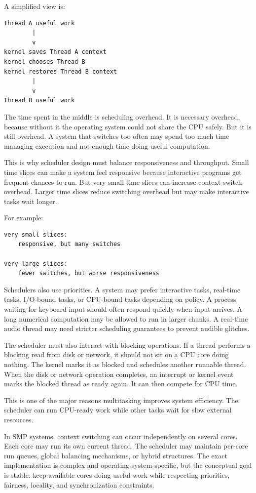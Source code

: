 A simplified view is:

\begin{verbatim}
Thread A useful work
        |
        v
kernel saves Thread A context
kernel chooses Thread B
kernel restores Thread B context
        |
        v
Thread B useful work
\end{verbatim}

The time spent in the middle is scheduling overhead. It is necessary overhead, because without it the operating system could not share the CPU safely. But it is still overhead. A system that switches too often may spend too much time managing execution and not enough time doing useful computation.

This is why scheduler design must balance responsiveness and throughput. Small time slices can make a system feel responsive because interactive programs get frequent chances to run. But very small time slices can increase context-switch overhead. Larger time slices reduce switching overhead but may make interactive tasks wait longer.

For example:

\begin{verbatim}
very small slices:
    responsive, but many switches

very large slices:
    fewer switches, but worse responsiveness
\end{verbatim}

Schedulers also use priorities. A system may prefer interactive tasks, real-time tasks, I/O-bound tasks, or CPU-bound tasks depending on policy. A process waiting for keyboard input should often respond quickly when input arrives. A long numerical computation may be allowed to run in larger chunks. A real-time audio thread may need stricter scheduling guarantees to prevent audible glitches.

The scheduler must also interact with blocking operations. If a thread performs a blocking read from disk or network, it should not sit on a CPU core doing nothing. The kernel marks it as blocked and schedules another runnable thread. When the disk or network operation completes, an interrupt or kernel event marks the blocked thread as ready again. It can then compete for CPU time.

This is one of the major reasons multitasking improves system efficiency. The scheduler can run CPU-ready work while other tasks wait for slow external resources.

In SMP systems, context switching can occur independently on several cores. Each core may run its own current thread. The scheduler may maintain per-core run queues, global balancing mechanisms, or hybrid structures. The exact implementation is complex and operating-system-specific, but the conceptual goal is stable: keep available cores doing useful work while respecting priorities, fairness, locality, and synchronization constraints.

